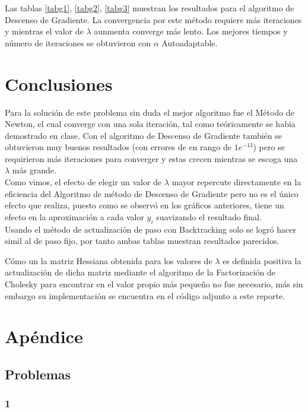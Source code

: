 \documentclass[conference]{IEEEtran}
\begin{document}
Las tablas \ref{tabg1}, \ref{tabg2}, \ref{tabg3} muestran los resultados para el
algoritmo de Descenso de Gradiente. La convergencia por este método requiere más
iteraciones y mientras el valor de $\lambda$ aunmenta converge más lento.
Los mejores tiempos y número de iteraciones se obtuvieron con $\alpha$
Autoadaptable.

\section{Conclusiones}

Para la solución de este problema sin duda el mejor algoritmo fue el Método de
Newton, el cual converge con una sola iteración, tal como teóricamente se habia
demostrado en clase. Con el algoritmo de Descenso de Gradiente también se
obtuvieron muy buenos resultados (con errores de en rango de $1e^{-13}$) pero
se requirieron más iteraciones para converger y estas crecen mientras se escoga
una $\lambda$ más grande. \\

Como vimos, el efecto de elegir un valor de $\lambda$ mayor repercute directamente
en la eficiencia del Algoritmo de método de Descenso de Gradiente pero no es el
único efecto que realiza, puesto como se observó en los gráficos anteriores,
tiene un efecto en la aproximación a cada valor $y_i$ suavizando el resultado final.\\

Usando el método de actualización de paso con Backtracking solo se logró hacer
simil al de paso fijo, por tanto ambas tablas muestran resultados parecidos.

Cómo un la matriz Hessiana obtenida para los valores de $\lambda$ es definida
positiva la actualización de dicha matriz mediante el algoritmo de la
Factorización de Cholesky para encontrar en el valor propio más pequeño
no fue necesario, más sin embargo su implementación se encuentra en el código
adjunto a este reporte.

\section{Apéndice}

\subsection{Problemas}

\subsubsection*{1}
\end{document}

